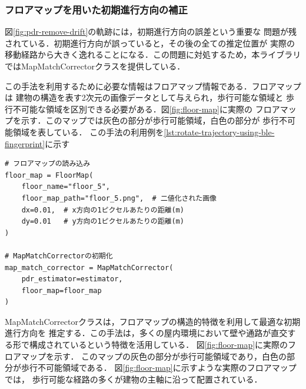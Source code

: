 

\subsubsection{フロアマップを用いた初期進行方向の補正}

図\ref{fig:pdr-remove-drift}の軌跡には，初期進行方向の誤差という重要な
問題が残されている．初期進行方向が誤っていると，その後の全ての推定位置が
実際の移動経路から大きく逸れることになる．この問題に対処するため，本ライブラリ
ではMapMatchCorrectorクラスを提供している．

この手法を利用するために必要な情報はフロアマップ情報である．フロアマップは
建物の構造を表す2次元の画像データとして与えられ，歩行可能な領域と
歩行不可能な領域を区別できる必要がある．図\ref{fig:floor-map}に実際の
フロアマップを示す．このマップでは灰色の部分が歩行可能領域，白色の部分が
歩行不可能領域を表している．
この手法の利用例を\ref{lst:rotate-trajectory-using-ble-fingerprint}に示す


\begin{lstlisting}[caption={MapMatchCorrectorの使用例},label=lst:rotate-trajectory-using-ble-fingerprint,float=ht]
# フロアマップの読み込み
floor_map = FloorMap(
    floor_name="floor_5",
    floor_map_path="floor_5.png",  # 二値化された画像
    dx=0.01,  # x方向の1ピクセルあたりの距離(m)
    dy=0.01   # y方向の1ピクセルあたりの距離(m)
)

# MapMatchCorrectorの初期化
map_match_corrector = MapMatchCorrector(
    pdr_estimator=estimator,
    floor_map=floor_map
)
\end{lstlisting}

MapMatchCorrectorクラスは，フロアマップの構造的特徴を利用して最適な初期進行方向を
推定する．この手法は，多くの屋内環境において壁や通路が直交する形で構成されているという特徴を活用している．
図\ref{fig:floor-map}に実際のフロアマップを示す．
このマップの灰色の部分が歩行可能領域であり，白色の部分が歩行不可能領域である．
図\ref{fig:floor-map}に示すような実際のフロアマップでは，
歩行可能な経路の多くが建物の主軸に沿って配置されている．

